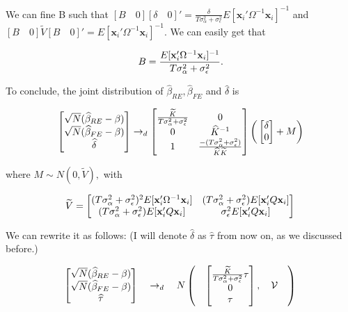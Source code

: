 \documentclass[12pt]{article}
\begin{document}
We can fine B such that $[B\quad 0][\delta\quad 0]' = \frac{\delta}{T \sigma_\alpha^2 + \sigma_\epsilon^2} E[\mathbf{x}_i' \Omega^{-1} \mathbf{x}_i]^{-1}$ and $[B\quad 0] \widetilde{V} [B\quad 0]' = E[\mathbf{x}_i' \Omega^{-1} \mathbf{x}_i]^{-1}$. We can easily get that 

\[
B = \frac{E[\mathbf{x}_i' \Omega^{-1} \mathbf{x}_i]^{-1}}{T\sigma_\alpha^2 + \sigma_\epsilon^2}.\\
\]

\vspace{0.2in}

To conclude, the joint distribution of $\widehat{\beta}_{RE}, \widehat{\beta}_{FE}$ and $\widehat{\delta}$ is

\[
 \begin{bmatrix}
\sqrt{N} (\widehat{\beta}_{RE} - \beta)\\
\sqrt{N} (\widehat{\beta}_{FE} - \beta)\\
\widehat{\delta}
\end{bmatrix} \rightarrow_d  \begin{bmatrix}
\frac{\widetilde{K}}{T\sigma_\alpha^2 + \sigma_\epsilon^2} & 0 \\
0 & \widehat{K}^{-1} \\
1 & \frac{-(T\sigma_\alpha^2 + \sigma_\epsilon^2)}{\widehat{K} \widetilde{K}}\\
\end{bmatrix} \bigg(\begin{bmatrix}
\delta\\
0
\end{bmatrix}   + M  \bigg)\\
\]


where  $M \sim N(0, \widetilde{V}),$ with

\[
\widetilde{V} =  \begin{bmatrix}
(T\sigma_\alpha^2 + \sigma_\epsilon^2)^2 E[\mathbf{x}_i' \Omega^{-1} \mathbf{x}_i] & (T\sigma_\alpha^2 + \sigma_\epsilon^2) E[\mathbf{x}_i' Q \mathbf{x}_i] \\
 (T\sigma_\alpha^2 + \sigma_\epsilon^2) E[\mathbf{x}_i' Q \mathbf{x}_i] & \sigma_\epsilon^2 E[\mathbf{x}_i' Q \mathbf{x}_i]
\end{bmatrix} \\
\]
\newpage

We can rewrite it as follows: (I will denote $\widehat{\delta}$ as $\widehat{\tau}$ from now on, as we discussed before.)

\[
 \begin{bmatrix}
\sqrt{N} (\widehat{\beta}_{RE} - \beta)\\
\sqrt{N} (\widehat{\beta}_{FE} - \beta)\\
\widehat{\tau}
\end{bmatrix} \quad \rightarrow_d \quad  N \left( \quad  \begin{bmatrix}
\frac{\widetilde{K}}{T\sigma_\alpha^2 + \sigma_\epsilon^2} \tau \\
0  \\
\tau\\
\end{bmatrix},  \quad \mathcal{V} \quad  \right)\\
\]
\end{document}
